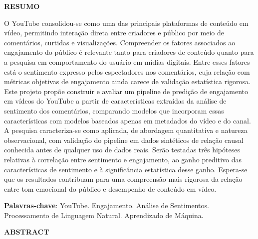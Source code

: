 \documentclass[12pt,a4paper]{article}
\begin{document}
\newpage
\begin{center}
\textbf{RESUMO}
\end{center}
\vspace{0.5cm}

O YouTube consolidou-se como uma das principais plataformas de conteúdo em vídeo, permitindo interação direta entre criadores e público por meio de comentários, curtidas e visualizações. Compreender os fatores associados ao engajamento do público é relevante tanto para criadores de conteúdo quanto para a pesquisa em comportamento do usuário em mídias digitais. Entre esses fatores está o sentimento expresso pelos espectadores nos comentários, cuja relação com métricas objetivas de engajamento ainda carece de validação estatística rigorosa. Este projeto propõe construir e avaliar um pipeline de predição de engajamento em vídeos do YouTube a partir de características extraídas da análise de sentimento dos comentários, comparando modelos que incorporam essas características com modelos baseados apenas em metadados do vídeo e do canal. A pesquisa caracteriza-se como aplicada, de abordagem quantitativa e natureza observacional, com validação do pipeline em dados sintéticos de relação causal conhecida antes de qualquer uso de dados reais. Serão testadas três hipóteses relativas à correlação entre sentimento e engajamento, ao ganho preditivo das características de sentimento e à significância estatística desse ganho. Espera-se que os resultados contribuam para uma compreensão mais rigorosa da relação entre tom emocional do público e desempenho de conteúdo em vídeo.

\vspace{0.5cm}
\noindent\textbf{Palavras-chave}: YouTube. Engajamento. Análise de Sentimentos. Processamento de Linguagem Natural. Aprendizado de Máquina.

\newpage
\begin{center}
\textbf{ABSTRACT}
\end{center}
\vspace{0.5cm}
\end{document}
